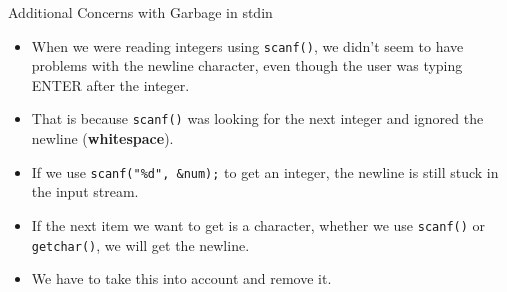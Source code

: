 \documentclass[graphics]{beamer}
\begin{document}
\begin{frame}[fragile]{Additional Concerns with Garbage in stdin}
    \begin{itemize}
        \item When we were reading integers using \texttt{scanf()}, we didn't seem to have problems with the newline character, even though the user was typing ENTER after the integer.
        \item That is because \texttt{scanf()} was looking for the next integer and ignored the newline (\textbf{whitespace}).
        \item If we use \texttt{scanf("\%d", \&num);} to get an integer, the newline is still stuck in the input stream.
        \item If the next item we want to get is a character, whether we use \texttt{scanf()} or \texttt{getchar()}, we will get the newline.
        \item We have to take this into account and remove it.
    \end{itemize}
\end{frame}
\end{document}
